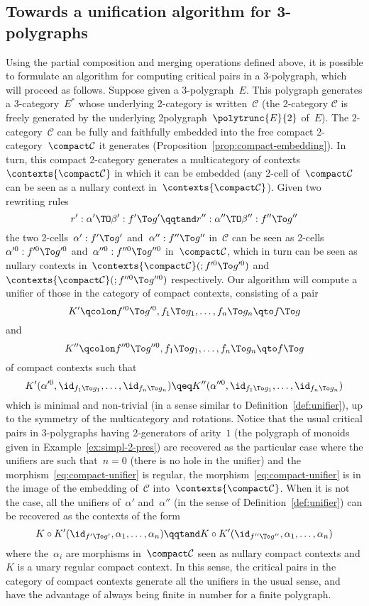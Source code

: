 \documentclass{LMCS}
\renewcommand{\C}{\mathcal{C}}
\begin{document}
\subsection{Towards a unification algorithm for 3-polygraphs}
\label{sec:algo}
Using the partial composition and merging operations defined above, it is
possible to formulate an algorithm for computing critical pairs in a
3-polygraph, which will proceed as follows. Suppose given a
3-polygraph~$E$. This polygraph generates a 3-category~$E^*$ whose underlying
2-category is written~$\C$ (the 2-category $\C$ is freely generated by the
underlying 2\nbd{}polygraph~$\polytrunc{E}{2}$ of~$E$). The 2-category~$\C$ can
be fully and faithfully embedded into the free compact 2-category~$\compact\C$
it generates (Proposition~\ref{prop:compact-embedding}).
In turn, this compact 2-category generates a multicategory of
contexts~$\contexts{\compact\C}$ in which it can be embedded (any 2-cell
of~$\compact\C$ can be seen as a nullary context
in~$\contexts{\compact\C}$). Given two rewriting rules
\[
r':\alpha'\TO\beta':f'\To g'
\qqtand
r'':\alpha''\TO\beta'':f''\To g''
\]
the two 2-cells~$\alpha':f'\To g'$ and~$\alpha'':f''\To g''$ in~$\C$ can be seen
as 2-cells~$\alpha'^0:f'^0\To g'^0$ and~$\alpha''^0:f''^0\To g''^0$
in~$\compact\C$, which in turn can be seen as nullary contexts
in~$\contexts{\compact\C}(;f'^0\To g'^0)$ and~$\contexts{\compact\C}(;f''^0\To
g''^0)$ respectively. Our algorithm will compute a unifier of those in the
category of compact contexts, consisting of a pair
\[
K'
\qcolon
f'^0\To g'^0,f_1\To g_1,\ldots,f_n\To g_n
\qto
f\To g
\]
and
\[
K''
\qcolon
f''^0\To g''^0,f_1\To g_1,\ldots,f_n\To g_n
\qto
f\To g
\]
of compact contexts such that
\begin{equation}
  \label{eq:compact-unifier}
  K'(\alpha'^0,\id_{f_1\To g_1},\ldots,\id_{f_n\To g_n})
  \qeq
  K''(\alpha''^0,\id_{f_1\To g_1},\ldots,\id_{f_n\To g_n})
\end{equation}
which is minimal and non-trivial (in a sense similar to
Definition~\ref{def:unifier}), up to the symmetry of the multicategory and
rotations. Notice that the usual critical pairs in 3-polygraphs having
2-generators of arity~$1$ (\eg the polygraph of monoids given in
Example~\ref{ex:simpl-2-pres}) are recovered as the particular case where the
unifiers are such that~$n=0$ (there is no hole in the unifier) and the
morphism~\eqref{eq:compact-unifier} is regular, \ie the
morphism~\eqref{eq:compact-unifier} is in the image of the embedding of~$\C$
into~$\contexts{\compact\C}$. When it is not the case, all the unifiers
of~$\alpha'$ and~$\alpha''$ (in the sense of Definition~\ref{def:unifier}) can
be recovered as the contexts of the form
\[
K\circ K'(\id_{f'\To g'},\alpha_1,\ldots,\alpha_n)
\qqtand
K\circ K'(\id_{f''\To g''},\alpha_1,\ldots,\alpha_n)
\]
where the~$\alpha_i$ are morphisms in~$\compact\C$ seen as nullary compact
contexts and $K$ is a unary regular compact context. In this sense, the critical
pairs in the category of compact contexts generate all the unifiers in the usual
sense, and have the advantage of always being finite in number for a finite
polygraph.
\end{document}
